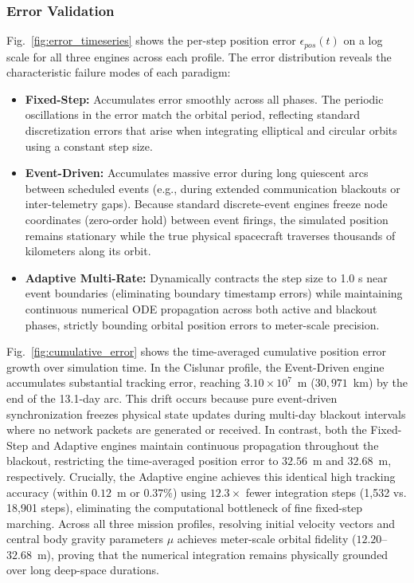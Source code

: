 \documentclass[a4paper,fleqn]{cas-sc}
\begin{document}
\subsubsection{Error Validation}
Fig.~\ref{fig:error_timeseries} shows the per-step position error $\epsilon_{pos}(t)$ on a log scale for all three engines across each profile. The error distribution reveals the characteristic failure modes of each paradigm:
\begin{itemize}
    \item \textbf{Fixed-Step:} Accumulates error smoothly across all phases. The periodic oscillations in the error match the orbital period, reflecting standard discretization errors that arise when integrating elliptical and circular orbits using a constant step size.
    \item \textbf{Event-Driven:} Accumulates massive error during long quiescent arcs between scheduled events (e.g., during extended communication blackouts or inter-telemetry gaps). Because standard discrete-event engines freeze node coordinates (zero-order hold) between event firings, the simulated position remains stationary while the true physical spacecraft traverses thousands of kilometers along its orbit.
    \item \textbf{Adaptive Multi-Rate:} Dynamically contracts the step size to 1.0 s near event boundaries (eliminating boundary timestamp errors) while maintaining continuous numerical ODE propagation across both active and blackout phases, strictly bounding orbital position errors to meter-scale precision.
\end{itemize}

Fig.~\ref{fig:cumulative_error} shows the time-averaged cumulative position error growth over simulation time. In the Cislunar profile, the Event-Driven engine accumulates substantial tracking error, reaching $3.10 \times 10^7$~m ($30,971$~km) by the end of the 13.1-day arc. This drift occurs because pure event-driven synchronization freezes physical state updates during multi-day blackout intervals where no network packets are generated or received. In contrast, both the Fixed-Step and Adaptive engines maintain continuous propagation throughout the blackout, restricting the time-averaged position error to $32.56$~m and $32.68$~m, respectively. Crucially, the Adaptive engine achieves this identical high tracking accuracy (within $0.12$~m or $0.37\%$) using $12.3\times$ fewer integration steps (1,532 vs. 18,901 steps), eliminating the computational bottleneck of fine fixed-step marching. Across all three mission profiles, resolving initial velocity vectors and central body gravity parameters $\mu$ achieves meter-scale orbital fidelity ($12.20$--$32.68$~m), proving that the numerical integration remains physically grounded over long deep-space durations.
\end{document}
